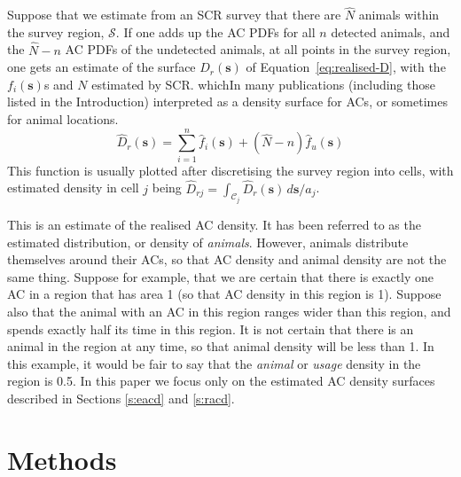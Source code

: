 \documentclass[useAMS,usenatbib,referee]{biom}
\begin{document}
Suppose that we estimate from an SCR survey that there are $\hat{N}$ animals within the survey region, $\mathcal{S}$. If one adds up the AC PDFs for all $n$ detected animals, and the $\hat{N}-n$ AC PDFs of the undetected animals, at all points in the survey region, one gets an estimate of the surface $D_r(\bm{s})$ of Equation~\eqref{eq:realised-D}, with the $f_i(\bm{s})$s and $N$ estimated by SCR.  whichIn many publications (including those listed in the Introduction) interpreted as a density surface for ACs, or sometimes for animal locations. %
\begin{equation}
\widehat{D}_r(\bm{s}) = \sum_{i = 1}^n \hat{f}_i(\bm{s}) + (\widehat{N} - n)\hat{f}_u(\bm{s})
\end{equation}
This function is usually plotted after discretising the survey region into cells, with estimated density in cell $j$ being $\widehat{D}_{rj}=\int_{\mathcal{C}_j}\widehat{D}_r(\bm{s})\, d\bm{s}/a_j$.

This is an estimate of the realised AC density. It has been referred to as the estimated distribution, or density of \textit{animals}. However, animals distribute themselves around their ACs, so that AC density and animal density are not the same thing. Suppose for example, that we are certain that there is exactly one AC in a region that has area 1 (so that AC density in this region is 1). Suppose also that the animal with an AC in this region ranges wider than this region, and spends exactly half its time in this region. It is not certain that there is an animal in the region at any time, so that animal density will be less than 1. In this example, it would be fair to say that the \textit{animal} or \textit{usage} density in the region is 0.5. In this paper we focus only on the estimated AC density surfaces described in Sections \ref{s:eacd} and \ref{s:racd}.

\section{Methods}
\end{document}
